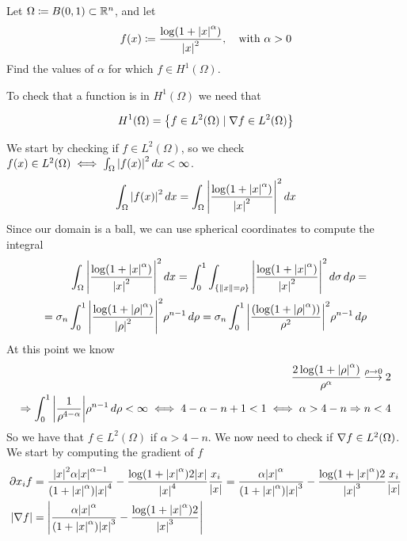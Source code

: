 \begin{exercise}
    Let \(\Omega \coloneqq B(0, 1) \subset \mathbb{R}^n\), and let 
    \[
        f(x) \coloneqq \frac{\log(1+\abs{x}^\alpha)}{\abs{x}^2}, \quad \text{with } \alpha > 0
    \]
    Find the values of \(\alpha\) for which \(f \in H^1(\Omega)\).
\end{exercise}
To check that a function is in \(H^1(\Omega)\) we need that
\begin{remark}
    \[
        H^1(\Omega) = \left\{ f \in L^2(\Omega) \mid \nabla f \in L^2(\Omega) \right\}
    \]  
\end{remark}
We start by checking if \(f \in L^2(\Omega)\), so we check \(f(x) \in L^2(\Omega) \iff \int_\Omega \abs{f(x)}^2 \, dx < \infty\).
\[
    \begin{split}
        \int_\Omega \abs{f(x)}^2 \, dx = \int_\Omega \abs{\frac{\log(1+\abs{x}^\alpha)}{\abs{x}^2}}^2 \, dx
    \end{split}
\]
Since our domain is a ball, we can use spherical coordinates to compute the integral
\[
    \begin{split}
        \int_\Omega \abs{\frac{\log(1+\abs{x}^\alpha)}{\abs{x}^2}}^2 \, dx = \int_0^1 \int_{\left\{\norm{x} = \rho\right\}} \abs{\frac{\log(1+\abs{x}^\alpha)}{\abs{x}^2}}^2 \, d\sigma \, d\rho = \\
        = \sigma_n \int_0^1 \abs{\frac{\log(1+\abs{\rho}^\alpha)}{\abs{\rho}^2}}^2 \rho^{n-1} \, d\rho = \sigma_n \int_0^1 \abs{\frac{(\log(1+\abs{\rho}^\alpha))}{\rho^{2}}}^2 \rho^{n-1} \, d\rho
    \end{split}
\]
At this point we know 
\[
    \begin{split}
        \frac{2\log(1+\abs{\rho}^\alpha)}{\rho^{\alpha}} \overset{\rho \to 0}{\longrightarrow} 2 \\ \Rightarrow \int_0^1 \abs{\frac{1}{\rho^{4-\alpha}}} \rho^{n-1} \, d\rho < \infty \iff 4 - \alpha - n + 1 < 1 \iff \alpha > 4 - n \Rightarrow n < 4
    \end{split}
\]
So we have that \(f \in L^2(\Omega)\) if \(\alpha > 4 - n\). We now need to check if \(\nabla f \in L^2(\Omega)\). We start by computing the gradient of \(f\)
\[
    \begin{split}
        \partial x_i f &= \frac{\abs{x}^2\alpha\abs{x}^{\alpha -1}}{(1 + \abs{x}^\alpha)\abs{x}^4} - \frac{\log(1 + \abs{x}^\alpha)2\abs{x}}{\abs{x}^4} \frac{x_i}{\abs{x}} = \frac{\alpha\abs{x}^{\alpha}}{(1 + \abs{x}^\alpha)\abs{x}^3} - \frac{\log(1 + \abs{x}^\alpha)2}{\abs{x}^3} \frac{x_i}{\abs{x}} \\
        \abs{\nabla f} &= \abs{\frac{\alpha\abs{x}^{\alpha}}{(1 + \abs{x}^\alpha)\abs{x}^3} - \frac{\log(1 + \abs{x}^\alpha)2}{\abs{x}^3}} 
    \end{split}
\]
